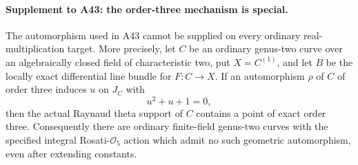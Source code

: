 \paragraph{Supplement to A43: the order-three mechanism is special.}
The automorphism used in A43 cannot be supplied on every ordinary
real-multiplication target.  More precisely, let $C$ be an ordinary
genus-two curve over an algebraically closed field of characteristic
two, put $X=C^{(1)}$, and let $B$ be the locally exact differential
line bundle for $F:C\to X$.  If an automorphism $\rho$ of $C$ of
order three induces $u$ on $J_C$ with
\[
                         u^2+u+1=0,
\]
then the actual Raynaud theta support of $C$ contains a point of
exact order three.  Consequently there are ordinary finite-field
genus-two curves with the specified integral Rosati-$\mathcal O_5$
action which admit no such geometric automorphism, even after
extending constants.

